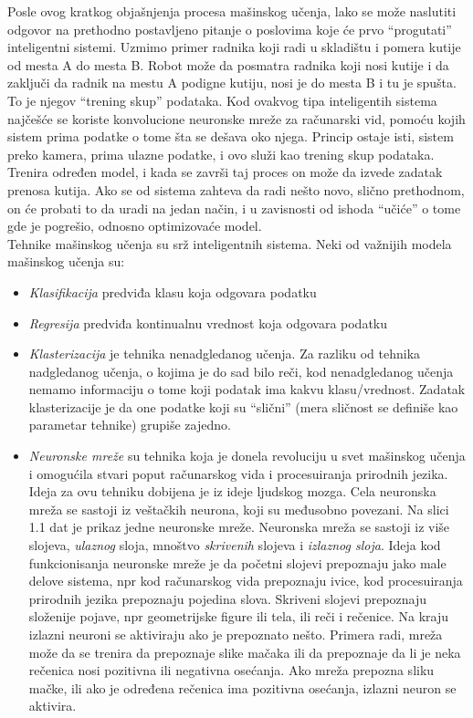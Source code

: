 \documentclass[a4paper,12pt]{report}
\begin{document}
Posle ovog kratkog objašnjenja procesa mašinskog učenja, lako se može naslutiti odgovor na prethodno postavljeno pitanje o poslovima koje će prvo 
\enquote{progutati} inteligentni sistemi. Uzmimo primer radnika koji radi u skladištu i pomera kutije od mesta A do mesta B. Robot može da posmatra radnika koji nosi kutije i da zaključi da radnik na mestu A podigne kutiju, nosi je do mesta B i tu je spušta. To je njegov \enquote{trening skup} podataka. Kod ovakvog tipa inteligentih sistema najčešće se koriste konvolucione neuronske mreže za računarski vid, pomoću kojih sistem prima podatke o tome šta se dešava oko njega. Princip ostaje isti, sistem preko kamera, prima ulazne podatke, i ovo služi kao trening skup podataka. Trenira određen model, i kada se završi taj proces on može da izvede zadatak prenosa kutija. Ako se od sistema zahteva da radi nešto novo, slično prethodnom, on će probati to da uradi na jedan način, i u zavisnosti od ishoda \enquote{učiće} o tome gde je pogrešio, odnosno optimizovaće model. \\

Tehnike mašinskog učenja su srž inteligentnih sistema. Neki od važnijih modela mašinskog učenja su: 
\begin{itemize}
	\item \textit{Klasifikacija} predviđa klasu koja odgovara podatku
	\item \textit{Regresija} predviđa kontinualnu vrednost koja odgovara podatku
	\item \textit{Klasterizacija} je tehnika nenadgledanog učenja. Za razliku od tehnika nadgledanog učenja, o kojima je do sad bilo reči, kod nenadgledanog učenja nemamo informaciju o tome koji podatak ima kakvu klasu/vrednost. Zadatak klasterizacije je da one podatke koji su \enquote{slični} (mera sličnost se definiše kao parametar tehnike) grupiše zajedno.
	\item \textit{Neuronske mreže} su tehnika koja je donela revoluciju u svet mašinskog učenja i omogućila stvari poput računarskog vida i procesuiranja prirodnih jezika. Ideja za ovu tehniku dobijena je iz ideje ljudskog mozga. Cela neuronska mreža se sastoji iz veštačkih neurona, koji su međusobno povezani. Na slici 1.1 dat je prikaz jedne neuronske mreže. Neuronska mreža se sastoji iz više slojeva, \textit{ulaznog} sloja, mnoštvo \textit{skrivenih} slojeva i \textit{izlaznog sloja}. Ideja kod funkcionisanja neuronske mreže je da početni slojevi prepoznaju jako male delove sistema, npr kod računarskog vida prepoznaju ivice, kod procesuiranja prirodnih jezika prepoznaju pojedina slova. Skriveni slojevi prepoznaju složenije pojave, npr geometrijske figure ili tela, ili reči i rečenice. Na kraju izlazni neuroni se aktiviraju ako je prepoznato nešto. Primera radi, mreža može da se trenira da prepoznaje slike mačaka ili da prepoznaje da li je neka rečenica nosi pozitivna ili negativna osećanja. Ako mreža prepozna sliku mačke, ili ako je određena rečenica ima pozitivna osećanja, izlazni neuron se aktivira. 
\end{itemize}
\end{document}
